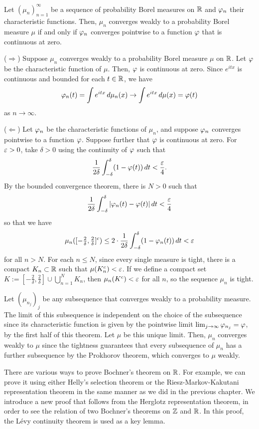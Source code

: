 \documentclass{../../small}
\begin{document}
\begin{thm}
Let $(\mu_n)_{n=1}^\infty$ be a sequence of probability Borel measures on $\mathbb{R}$ and $\varphi_n$ their characteristic functions.
Then, $\mu_n$ converges weakly to a probability Borel measure $\mu$ if and only if $\varphi_n$ converges pointwise to a function $\varphi$ that is continuous at zero.
\end{thm}
\begin{pf}
($\Rightarrow$)
Suppose $\mu_n$ converges weakly to a probability Borel measure $\mu$ on $\mathbb{R}$.
Let $\varphi$ be the characteristic function of $\mu$.
Then, $\varphi$ is continuous at zero.
Since $e^{itx}$ is continuous and bounded for each $t\in\mathbb{R}$, we have
\[\varphi_n(t)=\int e^{itx}\,d\mu_n(x)\to\int e^{itx}\,d\mu(x)=\varphi(t)\]
as $n\to\infty$.

($\Leftarrow$)
Let $\varphi_n$ be the characteristic functions of $\mu_n$, and suppose $\varphi_n$ converges pointwise to a function $\varphi$.
Suppose further that $\varphi$ is continuous at zero.
For $\varepsilon>0$, take $\delta>0$ using the continuity of $\varphi$ such that
\[\frac1{2\delta}\int_{-\delta}^\delta(1-\varphi(t))\,dt<\frac{\varepsilon}4.\]
By the bounded convergence theorem, there is $N>0$ such that
\[\frac1{2\delta}\int_{-\delta}^\delta|\varphi_n(t)-\varphi(t)|\,dt<\frac{\varepsilon}4\]
so that we have
\[\mu_n([-\tfrac2\delta,\tfrac2\delta]^c)\le2\cdot\frac1{2\delta}\int_{-\delta}^\delta(1-\varphi_n(t))\,dt<\varepsilon\]
for all $n>N$.
For each $n\le N$, since every single measure is tight, there is a compact $K_n\subset\mathbb{R}$ such that $\mu(K_n^c)<\varepsilon$.
If we define a compact set $K:=[-\frac2\delta,\frac2\delta]\cup\bigcup_{n=1}^NK_n$, then $\mu_n(K^c)<\varepsilon$ for all $n$, so the sequence $\mu_n$ is tight.

Let $(\mu_{n_j})_j$ be any subsequence that converges weakly to a probability measure.
The limit of this subsequence is independent on the choice of the subsequence since its characteristic function is given by the pointwise limit $\lim_{j\to\infty}\varphi_{n_j}=\varphi$, by the first half of this theorem.
Let $\mu$ be this unique limit.
Then, $\mu_n$ converges weakly to $\mu$ since the tightness guarantees that every subsequence of $\mu_n$ has a further subsequence by the Prokhorov theorem, which converges to $\mu$ weakly.
\end{pf}


There are various ways to prove Bochner's theorem on $\mathbb{R}$.
For example, we can prove it using either Helly's selection theorem or the Riesz-Markov-Kakutani representation theorem in the same manner as we did in the previous chapter.
We introduce a new proof that follows from the Herglotz representation theorem, in order to see the relation of two Bochner's theorems on $\mathbb{Z}$ and $\mathbb{R}$.
In this proof, the L\'evy continuity theorem is used as a key lemma.
\end{document}
